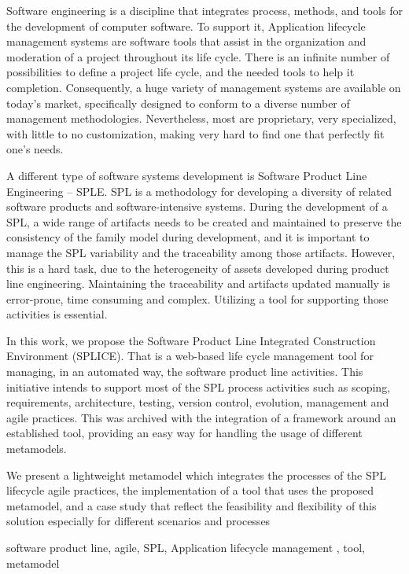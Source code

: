 

Software engineering is a discipline that integrates process, methods, and tools for the development of computer software. To support it, Application lifecycle management systems are software tools that assist in the organization and moderation of a project throughout its life cycle. There is an infinite number of possibilities to define a project life cycle, and the needed tools to help it completion. Consequently, a huge variety of management systems are available on today's market, specifically designed to conform to a diverse number of management methodologies. Nevertheless, most are proprietary, very specialized, with little to no customization, making very hard to find one that perfectly fit one's needs.

A different type of software systems development is Software Product Line Engineering -- SPLE. SPL is a methodology for developing a diversity of related software products and software-intensive systems. During the development of a SPL, a wide range of artifacts needs to be created and maintained to preserve the consistency of the family model during development, and it is important to manage the SPL variability and the traceability among those artifacts. However, this is a hard task, due to the heterogeneity of assets developed during product line engineering. Maintaining the traceability and artifacts updated manually is error-prone, time consuming and complex. Utilizing a tool for supporting those activities is essential. 

In this work, we propose the Software Product Line Integrated Construction Environment (SPLICE). That is a web-based life cycle management tool for managing, in an automated way, the software product line activities. This initiative intends to support most of the SPL process activities such as scoping, requirements, architecture, testing, version control, evolution, management and agile practices. This was archived with the integration of a framework around an established tool, providing an easy way for handling the usage of different metamodels.

We present a lightweight metamodel which integrates the processes of the SPL lifecycle agile practices, the implementation of a tool that uses the proposed metamodel, and a case study that reflect the feasibility and flexibility of this solution especially for different scenarios and processes



\begin{keywords}
software product line, agile, SPL, Application lifecycle management , tool, metamodel
\end{keywords}